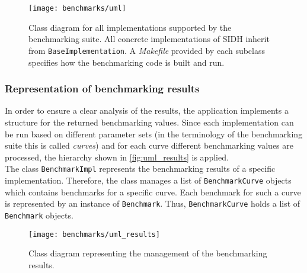 \begin{figure}[]
  \centering
  \texttt{[image: benchmarks/uml]}
  \caption[Class diagram for supported implementations]
  {Class diagram for all implementations supported by the benchmarking suite. All concrete implementations of \gls{SIDH} inherit from \texttt{BaseImplementation}. A \textit{Makefile} provided by each subclass specifies how the benchmarking code is built and run.} \label{fig:uml}
\end{figure}

\subsubsection{Representation of benchmarking results}
In order to ensure a clear analysis of the results, the application implements a structure for the returned benchmarking values. Since each implementation can be run based on different parameter sets (in the terminology of the benchmarking suite this is called \textit{curves}) and for each curve different benchmarking values are processed, the hierarchy shown in \autoref{fig:uml_results} is applied.\\
The class \texttt{BenchmarkImpl} represents the benchmarking results of a specific implementation. Therefore, the class manages a list of \texttt{BenchmarkCurve} objects which contains benchmarks for a specific curve. Each benchmark for such a curve is represented by an instance of \texttt{Benchmark}. Thus, \texttt{BenchmarkCurve} holds a list of \texttt{Benchmark} objects.
\begin{figure}[H]
  \centering
  \texttt{[image: benchmarks/uml\_results]}
  \caption[Class diagram for benchmarking results.]
  {Class diagram representing the management of the benchmarking results.}\label{fig:uml_results}
\end{figure}
\newpage
